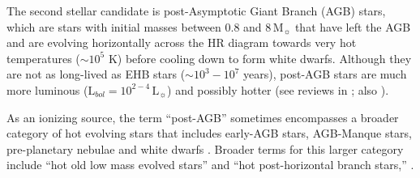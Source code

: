 \documentclass[preprint2]{aastex62}
\newcommand\Lsun{\ensuremath{\,\mathrm{L_{\sun}}}\xspace}
\newcommand\Msun{\ensuremath{\,\mathrm{M_{\sun}}}\xspace}
\begin{document}
The second stellar candidate is post-Asymptotic Giant Branch (AGB) stars, which are stars with initial masses between 0.8 and 8\Msun that have left the AGB and are evolving horizontally across the HR diagram towards very hot temperatures ($\sim10^5$ K) before cooling down to form white dwarfs. Although they are not as long-lived as EHB stars ($\sim10^3-10^7$ years), post-AGB stars are much more luminous ($\mathrm{L}_{bol} = 10^{2-4}\Lsun$) and possibly hotter (see reviews in \citealp{OConnell+1999, Grevesse+2010}; also \citealp{Bressan+2012}). 

As an ionizing source, the term ``post-AGB'' sometimes encompasses a broader category of hot evolving stars that includes early-AGB stars, AGB-Manque stars, pre-planetary nebulae and white dwarfs \citep{Stasinska+2008}. Broader terms for this larger category include ``hot old low mass evolved stars'' \citep[HOLMES; ][]{Fernandes+2011} and ``hot post-horizontal branch stars,'' \citep[HPHB; ][]{Rosenfield+2012}.
\end{document}
